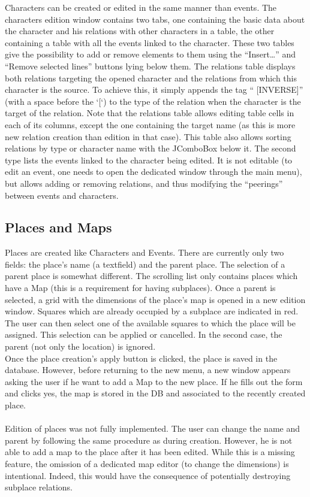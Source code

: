 \documentclass[a4paper ,12pt,french]{article}
\begin{document}
Characters can be created or edited in the same manner than events.
The characters edition window contains two tabs, one containing the basic data about the character and his relations with other characters in a table, the other containing a table with all the events linked to the character. These two tables give the possibility to add or remove elements to them using the “Insert…” and “Remove selected lines” buttons lying below them.
The relations table displays both relations targeting the opened character and the relations from which this character is the source. To achieve this, it simply appends the tag “ [INVERSE]” (with a space before the ‘[‘) to the type of the relation  when the character is the target of the relation.  Note that the relations table allows editing table cells in each of its columns, except the one containing the target name (as this is more new relation creation than edition in that case). This table also allows sorting relations by type or character name with the JComboBox below it. 
The second type lists the events linked to the character being edited. It is not editable (to edit an event, one needs to open the dedicated window through the main menu), but allows adding or removing relations, and thus modifying the “peerings” between events and characters.

\subsection{Places and Maps}
Places are created like Characters and Events. There are currently only two fields: the place's name (a textfield) and the parent place. The selection of a parent place is somewhat different. The scrolling list only contains places which have a Map (this is a requirement for having subplaces). Once a parent is selected, a grid with the dimensions of the place's map is opened in a new edition window. Squares which are already occupied by a subplace are indicated in red. The user can then select one of the available squares to which the place will be assigned. This selection can be applied or cancelled. In the second case, the parent (not only the location) is ignored. \\
Once the place creation's apply button is clicked, the place is saved in the database. However, before returning to the new menu, a new window appears asking the user if he want to add a Map to the new place. If he fills out the form and clicks yes, the map is stored in the DB and associated to the recently created place. \\ \\
Edition of places was not fully implemented. The user can change the name and parent by following the same procedure as during creation. However, he is not able to add a map to the place after it has been edited. While this is a missing feature, the omission of a dedicated map editor (to change the dimensions) is intentional. Indeed, this would have the consequence of potentially destroying subplace relations.
\end{document}
